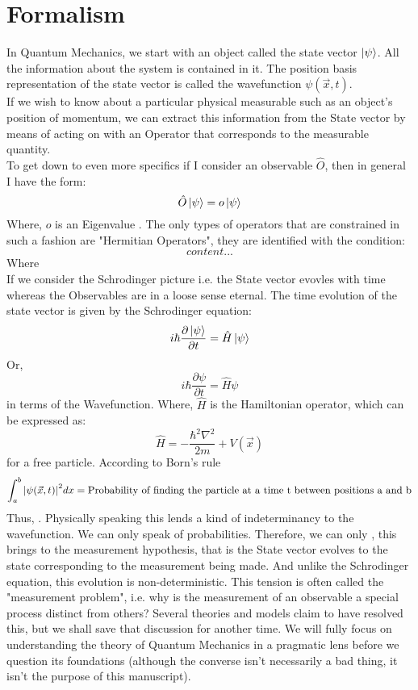 \chapter{Formalism}
In Quantum Mechanics, we start with an object called the state vector $\ket{\psi}$. All the information about the system is contained in it. The position basis representation of the state vector is called the wavefunction $\psi (\vec{x}, t)$. \\
If we wish to know about a particular physical measurable such as an object's position of momentum, we can extract this information from the State vector by means of acting on with an Operator that corresponds to the measurable quantity.\\

To get down to even more specifics if I consider an observable $\hat{O}$, then in general I have the form:
\begin{equation}
\hat{O} \ket{\psi} = o \ket{\psi}
\end{equation}
Where, $o$ is an Eigenvalue . The only types of operators that are constrained in such a fashion are "Hermitian Operators", they are identified with the condition:
\begin{equation}
	content...
\end{equation}
Where\\
If we consider the Schrodinger picture i.e. the State vector evovles with time whereas the Observables are in a loose sense eternal. The time evolution of the state vector is given by the Schrodinger equation:
\begin{equation}
	i \hbar \frac{\partial \ket{\psi}}{\partial t} = \hat{H} \ket{\psi}
\end{equation}
Or,
\begin{equation}
i \hbar \frac{\partial \psi}{\partial t} = \hat{H} \psi
\end{equation}
in terms of the Wavefunction. Where, $\hat{H}$ is the Hamiltonian operator, which can be expressed as:
\begin{equation}
\hat{H} = -\frac{\hbar^{2} \nabla^2}{2m} + V(\vec{x})
\end{equation}
for a free particle. According to Born's rule
\begin{equation}
	\int_{a}^{b} \abs{\psi(\vec{x}, t)}^{2} dx = \text{Probability of finding the particle at a time t between positions a and b}
\end{equation}
Thus, . Physically speaking this lends a kind of indeterminancy to the wavefunction. We can only speak of probabilities. Therefore, we can only , this brings to the measurement hypothesis, that is the State vector evolves to the state corresponding to the measurement being made. And unlike the Schrodinger equation, this evolution is non-deterministic. This tension is often called the "measurement problem", i.e. why is the measurement of an observable a special process distinct from others? Several theories and models claim to have resolved this, but we shall save that discussion for another time. We will fully focus on understanding the theory of Quantum Mechanics in a pragmatic lens before we question its foundations (although the converse isn't necessarily a bad thing, it isn't the purpose of this manuscript).
